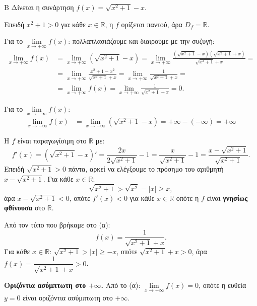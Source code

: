\begin{thema}{Β}
Δίνεται η συνάρτηση $f(x) = \sqrt{x^2+1} - x$.

\begin{erwthma}

\item Επειδή $x^2+1>0$ για κάθε $x\in\mathbb{R}$, η $f$ ορίζεται παντού, άρα $D_f=\mathbb{R}$.

Για το $\lim\limits_{x\to+\infty}f(x)$: πολλαπλασιάζουμε και διαιρούμε με την συζυγή:
\begin{align*}
\lim\limits_{x\to+\infty}f(x)&=\lim\limits_{x\to+\infty}\left( \sqrt{x^2+1}-x\right) =\lim\limits_{x\to+\infty}\frac{(\sqrt{x^2+1}-x)(\sqrt{x^2+1}+x)}{\sqrt{x^2+1}+x}=\\&=\lim\limits_{x\to+\infty}\frac{x^2+1-x^2}{\sqrt{x^2+1}+x}=\lim\limits_{x\to+\infty}\frac{1}{\sqrt{x^2+1}+x}=\\
&=\lim_{x\to+\infty} f(x)=\lim_{x\to+\infty}\frac{1}{\sqrt{x^2+1}+x}=0.
\end{align*}

Για το $\lim\limits_{x\to-\infty}f(x)$:
\begin{align*}
\lim\limits_{x\to-\infty}{f(x)}&=\lim\limits_{x\to-\infty}{\left(\sqrt{x^2+1}-x\right)}=+\infty-(-\infty)=+\infty
\end{align*}

\item Η $f$ είναι παραγωγίσιμη στο $\mathbb{R}$ με:
\[
f'(x)=\left(\sqrt{x^2+1}-x\right)'=\frac{2x}{2\sqrt{x^2+1}}-1=\frac{x}{\sqrt{x^2+1}}-1=\frac{x-\sqrt{x^2+1}}{\sqrt{x^2+1}}.
\]
Επειδή $\sqrt{x^2+1}>0$ πάντα, αρκεί να ελέγξουμε το πρόσημο του αριθμητή $x-\sqrt{x^2+1}$.
Για κάθε $x\in\mathbb{R}$:
\[
\sqrt{x^2+1}>\sqrt{x^2}=|x|\geq x,
\]
άρα $x-\sqrt{x^2+1}<0$, οπότε $f'(x)<0$ για κάθε $x\in\mathbb{R}$ οπότε η $f$ είναι \textbf{γνησίως φθίνουσα} στο $\mathbb{R}$.

Από τον τύπο που βρήκαμε στο (α):
\[
f(x)=\frac{1}{\sqrt{x^2+1}+x}.
\]
Για κάθε $x\in\mathbb{R}$: $\sqrt{x^2+1}>|x|\geq-x$, οπότε $\sqrt{x^2+1}+x>0$, άρα $f(x)=\dfrac{1}{\sqrt{x^2+1}+x}>0$.

\item \textbf{Οριζόντια ασύμπτωτη στο $+\infty$.}
Από το (α): $\lim\limits_{x\to+\infty}f(x)=0$, οπότε η ευθεία $y=0$ είναι {οριζόντια ασύμπτωτη} στο $+\infty$.


\end{erwthma}
\end{thema}

